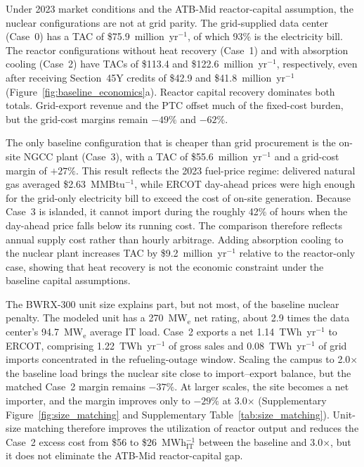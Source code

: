 \documentclass[a4paper,fleqn]{cas-sc}
\begin{document}
Under 2023 market conditions and the ATB-Mid reactor-capital assumption, the nuclear configurations are not at grid parity. The grid-supplied data center (Case~0) has a TAC of \$75.9~million~yr$^{-1}$, of which 93\% is the electricity bill. The reactor configurations without heat recovery (Case~1) and with absorption cooling (Case~2) have TACs of \$113.4 and \$122.6~million~yr$^{-1}$, respectively, even after receiving Section~45Y credits of \$42.9 and \$41.8~million~yr$^{-1}$ (Figure~\ref{fig:baseline_economics}a). Reactor capital recovery dominates both totals. Grid-export revenue and the PTC offset much of the fixed-cost burden, but the grid-cost margins remain $-49\%$ and $-62\%$.

The only baseline configuration that is cheaper than grid procurement is the on-site NGCC plant (Case~3), with a TAC of \$55.6~million~yr$^{-1}$ and a grid-cost margin of $+27\%$. This result reflects the 2023 fuel-price regime: delivered natural gas averaged \$2.63~MMBtu$^{-1}$, while ERCOT day-ahead prices were high enough for the grid-only electricity bill to exceed the cost of on-site generation. Because Case~3 is islanded, it cannot import during the roughly 42\% of hours when the day-ahead price falls below its running cost. The comparison therefore reflects annual supply cost rather than hourly arbitrage. Adding absorption cooling to the nuclear plant increases TAC by \$9.2~million~yr$^{-1}$ relative to the reactor-only case, showing that heat recovery is not the economic constraint under the baseline capital assumptions.

The BWRX-300 unit size explains part, but not most, of the baseline nuclear penalty. The modeled unit has a 270~MW$_\mathrm{e}$ net rating, about 2.9 times the data center's 94.7~MW$_\mathrm{e}$ average IT load. Case~2 exports a net 1.14~TWh~yr$^{-1}$ to ERCOT, comprising 1.22~TWh~yr$^{-1}$ of gross sales and 0.08~TWh~yr$^{-1}$ of grid imports concentrated in the refueling-outage window. Scaling the campus to 2.0$\times$ the baseline load brings the nuclear site close to import--export balance, but the matched Case~2 margin remains $-37\%$. At larger scales, the site becomes a net importer, and the margin improves only to $-29\%$ at 3.0$\times$ (Supplementary Figure~\ref{fig:size_matching} and Supplementary Table~\ref{tab:size_matching}). Unit-size matching therefore improves the utilization of reactor output and reduces the Case~2 excess cost from \$56 to \$26~MWh$_\mathrm{IT}^{-1}$ between the baseline and 3.0$\times$, but it does not eliminate the ATB-Mid reactor-capital gap.
\end{document}
